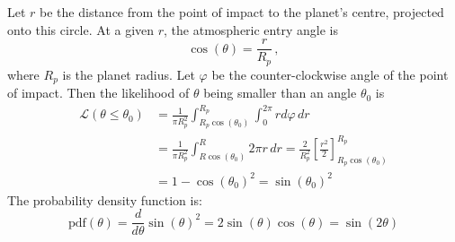 Let $r$ be the distance from the point of impact to the planet's centre, projected onto this circle. At a given $r$, the atmospheric entry angle is
\begin{equation*}
    \cos(\theta) = \frac{r}{R_p}\,,
\end{equation*}
where $R_p$ is the planet radius. Let $\varphi$ be the counter-clockwise angle of the point of impact. Then the likelihood of $\theta$ being smaller than an angle $\theta_0$ is
\begin{align}
    \mathcal{L}(\theta \leq \theta_0) &= \frac{1}{\pi R_p^2} \int_{R_p\cos(\theta_0)}^{R_p} \int_0^{2\pi} r d\varphi\, dr \nonumber\\
    &= \frac{1}{\pi R_p^2} \int_{R\cos(\theta_0)}^R 2\pi r\, dr = \frac{2}{R_p^2} \left[\frac{r^2}{2}\right]_{R_p\cos(\theta_0)}^{R_p} \nonumber\\
    &= 1 - \cos(\theta_0)^2 = \sin(\theta_0)^2
\end{align}
The probability density function is:
\begin{equation}
    \mathrm{pdf}(\theta) = \frac{d}{d\theta}\sin(\theta)^2 = 2\sin(\theta)\cos(\theta) = \sin(2\theta)
\end{equation}
